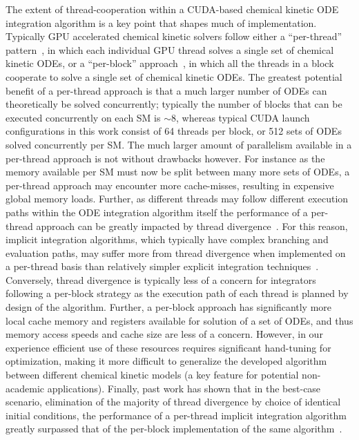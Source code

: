 \documentclass[final,twocolumn]{elsarticle}
\begin{document}
The extent of thread-cooperation within a CUDA-based chemical kinetic ODE integration algorithm is a key point that shapes much of implementation.
Typically GPU accelerated chemical kinetic solvers follow either a ``per-thread'' pattern~\cite{Niemeyer:2011aa,Stone:2013aa,Niemeyer:2014aa}, in which each individual GPU thread solves a single set of chemical kinetic ODEs, or a ``per-block'' approach~\cite{Stone:2013aa,Sewerin20151375}, in which all the threads in a block cooperate to solve a single set of chemical kinetic ODEs.
The greatest potential benefit of a per-thread approach is that a much larger number of ODEs can theoretically be solved concurrently; typically the number of blocks that can be executed concurrently on each SM is $\sim$8, whereas typical CUDA launch configurations in this work consist of 64 threads per block, or 512 sets of ODEs solved concurrently per SM.
The much larger amount of parallelism available in a per-thread approach is not without drawbacks however.
For instance as the memory available per SM must now be split between many more sets of ODEs, a per-thread approach may encounter more cache-misses, resulting in expensive global memory loads.
Further, as different threads may follow different execution paths within the ODE integration algorithm itself the performance of a per-thread approach can be greatly impacted by thread divergence~\cite{Stone:2013aa,Niemeyer:2014aa}.
For this reason, implicit integration algorithms, which typically have complex branching and evaluation paths, may suffer more from thread divergence when implemented on a per-thread basis than relatively simpler explicit integration techniques~\cite{Stone:2013aa}.
Conversely, thread divergence is typically less of a concern for integrators following a per-block strategy as the execution path of each thread is planned by design of the algorithm.
Further, a per-block approach has significantly more local cache memory and registers available for solution of a set of ODEs, and thus memory access speeds and cache size are less of a concern.
However, in our experience efficient use of these resources requires significant hand-tuning for optimization, making it more difficult to generalize the developed algorithm between different chemical kinetic models (a key feature for potential non-academic applications).
Finally, past work has shown that in the best-case scenario, elimination of the majority of thread divergence by choice of identical initial conditions, the performance of a per-thread implicit integration algorithm greatly surpassed that of the per-block implementation of the same algorithm~\cite{Stone:2013aa}.
\end{document}
